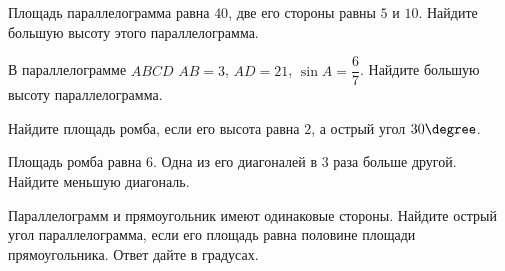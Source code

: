 \begin{class}[number=5-6]
\begin{listofex}
		\item Площадь параллелограмма равна \( 40 \), две его стороны равны \( 5 \) и \( 10 \). Найдите большую высоту этого параллелограмма.
		\item В параллелограмме \( ABCD \) \( AB=3 \), \( AD=21 \),  \( \sin A=\dfrac{6}{7} \).  Найдите большую высоту параллелограмма.
		\item Найдите площадь ромба, если его высота равна \( 2 \), а острый угол \( 30\degree \).
		\item Площадь ромба равна \( 6 \). Одна из его диагоналей в \( 3 \) раза больше другой. Найдите меньшую диагональ.
		\item Параллелограмм и прямоугольник имеют одинаковые стороны. Найдите острый угол параллелограмма, если его площадь равна половине площади прямоугольника. Ответ дайте в градусах.
	\end{listofex}
\end{class}

